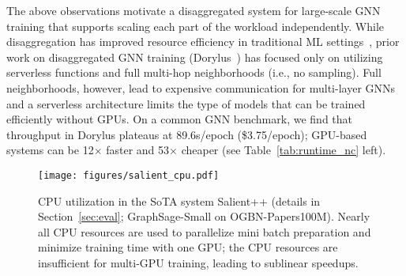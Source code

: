 The above observations motivate a disaggregated system for large-scale GNN training that supports scaling each part of the workload independently. While disaggregation has improved resource efficiency in traditional ML settings~\cite{graur2022cachew, jin2024efficient}, prior work on disaggregated GNN training (Dorylus~\cite{dorylus}) has focused only on utilizing serverless functions and full multi-hop neighborhoods (i.e., no sampling). Full neighborhoods, however, lead to expensive communication for multi-layer GNNs and a serverless architecture limits the type of models that can be trained efficiently without GPUs. On a common GNN benchmark, we find that throughput in Dorylus plateaus at 89.6s/epoch (\$3.75/epoch); GPU-based systems can be 12$\times$ faster and 53$\times$ cheaper (see Table~\ref{tab:runtime_nc} left). 


\begin{figure}[t]
  \centering
  \texttt{[image: figures/salient\_cpu.pdf]}
  \vspace{-0.15in}
  \caption{CPU utilization in the SoTA system Salient++ (details in Section~\ref{sec:eval}; GraphSage-Small on OGBN-Papers100M). Nearly all CPU resources are used to parallelize mini batch preparation and minimize training time with one GPU; the CPU resources are insufficient for multi-GPU training, leading to sublinear speedups.}
  \label{fig:salient_cpu}
  \vspace{-0.15in}
\end{figure}
